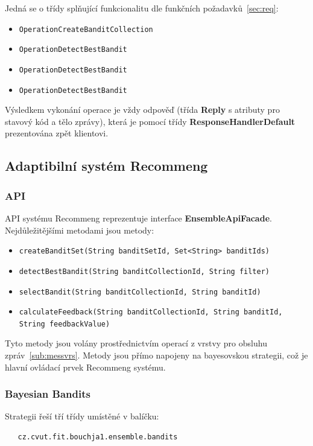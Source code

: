 \documentclass[thesis=M,czech]{FITthesis}[2014/05/07]
\begin{document}
Jedná se o třídy splňující funkcionalitu dle funkčních požadavků~\ref{sec:req}:

\begin{itemize}
	\item \texttt{OperationCreateBanditCollection}
	\item \texttt{OperationDetectBestBandit}
	\item \texttt{OperationDetectBestBandit}
	\item \texttt{OperationDetectBestBandit}			
\end{itemize}

Výsledkem vykonání operace je vždy odpověď (třída \textbf{Reply} s atributy pro stavový kód a tělo zprávy), která je pomocí třídy \textbf{ResponseHandlerDefault} prezentována zpět klientovi.

\subsection{Adaptibilní systém Recommeng}

\subsubsection{API}
API systému Recommeng reprezentuje interface \textbf{EnsembleApiFacade}. Nejdůležitějšími metodami jsou metody:

\begin{itemize}
	\item \texttt{createBanditSet(String banditSetId, Set<String> banditIds)}
	\item \texttt{detectBestBandit(String banditCollectionId, String filter)}
	\item \texttt{selectBandit(String banditCollectionId, String banditId)}
	\item \texttt{calculateFeedback(String banditCollectionId, String banditId, String feedbackValue)}			
\end{itemize}

Tyto metody jsou volány prostřednictvím operací z vrstvy pro obsluhu zpráv~\ref{sub:messvrs}. Metody jsou přímo napojeny na bayesovskou strategii, což je hlavní ovládací prvek Recommeng systému.

\subsubsection{Bayesian Bandits}
Strategii řeší tří třídy umístěné v balíčku:

\begin{verbatim}
   cz.cvut.fit.bouchja1.ensemble.bandits
\end{verbatim}
\end{document}
